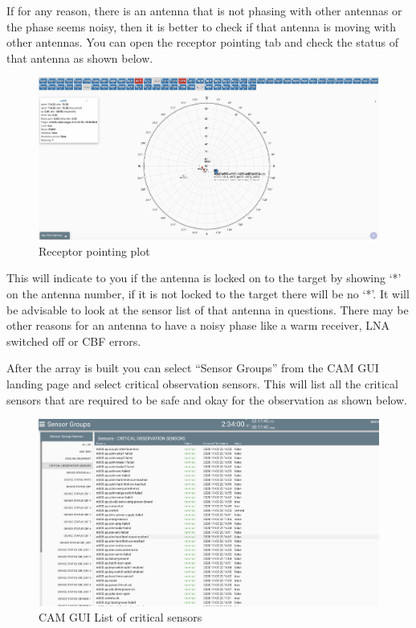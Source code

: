 \begin{itemize}
If for any reason, there is an antenna that is not phasing with other antennas or the phase seems noisy, then it is better to check if that antenna is moving with other antennas. You can open the receptor pointing tab and check the status of that antenna as shown below. 


\begin{figure}[H]
	\centering
	\includegraphics[scale=0.2]{Chapters/images/image76.png}
	
	\caption{Receptor pointing plot}
	\label{fig:image76}
\end{figure}


This will indicate to you if the antenna is locked on to the target by showing ‘*’ on the antenna number, if it is not locked to the target there will be no ‘*’. It will be advisable to look at the sensor list of that antenna in questions. 
There may be other reasons for an antenna to have a noisy phase like a warm receiver, LNA switched off or CBF errors. 

After the array is built  you can select “Sensor Groups” from the CAM GUI landing page and select critical observation sensors. This will list all the critical sensors that are required to be safe and okay for the observation as shown below.  

\end{itemize}

\begin{figure}[H]
	\centering
	\includegraphics[scale=0.2]{Chapters/images/image125.png}
	
	\caption{CAM GUI List of critical sensors}
	\label{fig:image125}
\end{figure}


